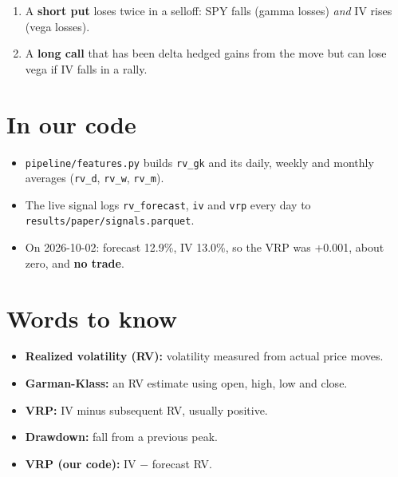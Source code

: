 \documentclass{article}
\begin{document}
\begin{enumerate}

\item A \textbf{short put} loses twice in a selloff: SPY falls (gamma losses) \emph{and} IV rises (vega losses).

\item A \textbf{long call} that has been delta hedged gains from the move but can lose vega if IV falls in a rally.

\end{enumerate}

\section{In our code}

\begin{itemize}

\item \texttt{pipeline/\allowbreak{}features.\allowbreak{}py} builds \texttt{rv\_\allowbreak{}gk} and its daily, weekly and monthly averages (\texttt{rv\_\allowbreak{}d}, \texttt{rv\_\allowbreak{}w}, \texttt{rv\_\allowbreak{}m}).

\item The live signal logs \texttt{rv\_\allowbreak{}forecast}, \texttt{iv} and \texttt{vrp} every day to \texttt{results/\allowbreak{}paper/\allowbreak{}signals.\allowbreak{}parquet}.

\item On 2026-10-02: forecast 12.9\%, IV 13.0\%, so the VRP was +0.001, about zero, and \textbf{no trade}.

\end{itemize}

\section{Words to know}

\begin{itemize}

\item \textbf{Realized volatility (RV):} volatility measured from actual price moves.

\item \textbf{Garman-Klass:} an RV estimate using open, high, low and close.

\item \textbf{VRP:} IV minus subsequent RV, usually positive.

\item \textbf{Drawdown:} fall from a previous peak.

\item \textbf{VRP (our code):} IV \ensuremath{-} forecast RV.

\end{itemize}
\end{document}
